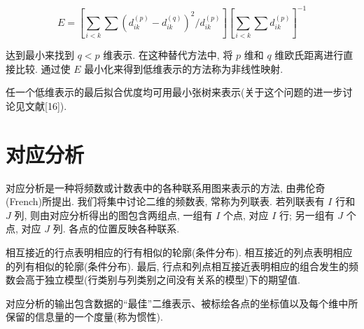 
\begin{mvfigure}
\label{fig:12.20}
\end{mvfigure}

\label{eq:12-27}
\begin{equation}
E=\left[\sum_{i<k}\sum\left(d_{ik}^{(p)}-d_{ik}^{(q)}\right)^2\Big/d_{ik}^{(p)}\right]
\left[\sum_{i<k}\sum d_{ik}^{(p)}\right]^{-1}
\tag{12-27}
\end{equation}

达到最小来找到 $q<p$ 维表示. 在这种替代方法中, 将 $p$ 维和 $q$ 维欧氏距离进行直接比较. 通过使 $E$ 最小化来得到低维表示的方法称为非线性映射.

任一个低维表示的最后拟合优度均可用最小张树来表示(关于这个问题的进一步讨论见文献[16]).

\section{对应分析}
\label{sec:12.7}

对应分析是一种将频数或计数表中的各种联系用图来表示的方法, 由弗伦奇(French)所提出. 我们将集中讨论二维的频数表, 常称为列联表. 若列联表有 $I$ 行和 $J$ 列, 则由对应分析得出的图包含两组点, 一组有 $I$ 个点, 对应 $I$ 行; 另一组有 $J$ 个点, 对应 $J$ 列. 各点的位置反映各种联系.

相互接近的行点表明相应的行有相似的轮廓(条件分布). 相互接近的列点表明相应的列有相似的轮廓(条件分布). 最后, 行点和列点相互接近表明相应的组合发生的频数会高于独立模型(行类别与列类别之间没有关系的模型)下的期望值.

对应分析的输出包含数据的“最佳”二维表示、被标绘各点的坐标值以及每个维中所保留的信息量的一个度量(称为惯性).
